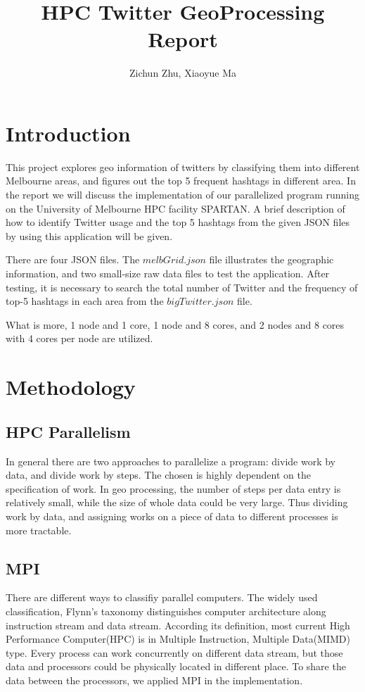 \documentclass[11pt]{article}
\title{HPC Twitter GeoProcessing Report}
\author
{Zichun Zhu, Xiaoyue Ma}
\begin{document}
\maketitle


\section{Introduction}
This project explores geo information of twitters by classifying them into different Melbourne areas, and figures out the top 5 frequent hashtags in different area. In the report we will discuss the implementation of our parallelized program running on the University of Melbourne HPC facility SPARTAN. A brief description of how to identify Twitter usage and the top 5 hashtags from the given JSON files by using this application will be given.

There are four JSON files. The $melbGrid.json$ file illustrates the geographic information, and two small-size raw data files to test the application. After testing, it is necessary to search the total number of Twitter and the frequency of top-5 hashtags in each area from the $bigTwitter.json$ file.

What is more, 1 node and 1 core, 1 node and 8 cores, and 2 nodes and 8 cores with 4 cores per node are utilized.

\section{Methodology}

\subsection{HPC Parallelism}
In general there are two approaches to parallelize a program: divide work by data, and divide work by steps. The chosen is highly dependent on the specification of work. In geo processing, the number of steps per data entry is relatively small, while the size of whole data could be very large. Thus dividing work by data, and assigning works on a piece of data to different processes is more tractable.

\subsection{MPI}
There are different ways to classifiy parallel computers. The widely used classification, Flynn's taxonomy distinguishes computer architecture along instruction stream and data stream. According its definition, most current High Performance Computer(HPC) is in Multiple Instruction, Multiple Data(MIMD) type. Every process can work concurrently on different data stream, but those data and processors could be physically located in different place. To share the data between the processors,  we applied MPI in the implementation.
\end{document}
